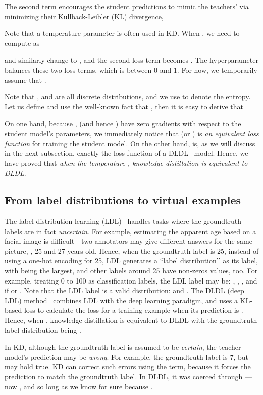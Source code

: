 \documentclass[10pt,twocolumn,letterpaper]{article}
\begin{document}
The second term encourages the student predictions to mimic the teachers’ via minimizing their Kullback-Leibler (KL) divergence,

Note that a temperature parameter  is often used in KD. When , we need to compute  as

and  similarly change  to , and the second loss term becomes . The hyperparameter  balances these two loss terms, which is between 0 and 1. For now, we temporarily assume that .

Note that ,  and  are all discrete distributions, and we use  to denote the entropy. Let us define 
 and use the well-known fact that , then it is easy to derive that


On one hand, because ,  (and hence ) have zero gradients with respect to the student model’s parameters, we immediately notice that  (or ) is \emph{an equivalent loss function} for training the student model. On the other hand,  is, as we will discuss in the next subsection, exactly the loss function of a DLDL~\cite{gao2017DLDL} model. Hence, we have proved that \emph{when  the temperature , knowledge distillation is equivalent to DLDL}.

\subsection{From label distributions to virtual examples}\label{sec:ve}

The label distribution learning (LDL)~\cite{geng2016label} handles tasks where the groundtruth labels are in fact \emph{uncertain}. For example, estimating the apparent age based on a facial image is difficult---two annotators may give different answers for the same picture, \eg, 25 and 27 years old. Hence, when the groundtruth label is 25, instead of using a one-hot encoding for 25, LDL generates a ``label distribution’’  as its label, with  being the largest, and other labels around 25 have non-zeros values, too. For example, treating 0 to 100 as  classification labels, the LDL label may be: , , , and  if  or . Note that the LDL label  is a valid distribution:  and . The DLDL (deep LDL) method~\cite{gao2017DLDL} combines LDL with the deep learning paradigm, and uses a KL-based loss  to calculate the loss for a training example when its prediction is . Hence, when , knowledge distillation is equivalent to DLDL with the groundtruth label distribution being .

In KD, although the groundtruth label is assumed to be \emph{certain}, the teacher model’s prediction may be \emph{wrong}. For example, the groundtruth label is 7, but  may hold true. KD can correct such errors using the  term, because it forces the prediction to match the groundtruth label. In DLDL, it was coerced through ---now , and so long as  we know for sure  because .
\end{document}
